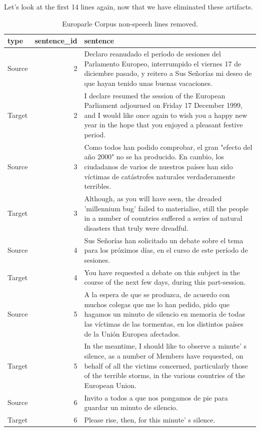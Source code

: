 \documentclass[
  letterpaper,
]{latex/krantz}
\begin{document}
Let's look at the first 14 lines again, now that we have eliminated
these artifacts.

\hypertarget{tbl-td-europarle-preview-2}{}
\begin{table}
\caption{\label{tbl-td-europarle-preview-2}Europarle Corpus non-speech lines removed. }\tabularnewline

\centering
\begin{tabular}{lrl}
\toprule
type & sentence\_id & sentence\\
\midrule
Source & 2 & Declaro reanudado el período de sesiones del Parlamento Europeo, interrumpido el viernes 17 de diciembre pasado, y reitero a Sus Señorías mi deseo de que hayan tenido unas buenas vacaciones.\\
Target & 2 & I declare resumed the session of the European Parliament adjourned on Friday 17 December 1999, and I would like once again to wish you a happy new year in the hope that you enjoyed a pleasant festive period.\\
Source & 3 & Como todos han podido comprobar, el gran "efecto del año 2000" no se ha producido. En cambio, los ciudadanos de varios de nuestros países han sido víctimas de catástrofes naturales verdaderamente terribles.\\
Target & 3 & Although, as you will have seen, the dreaded 'millennium bug' failed to materialise, still the people in a number of countries suffered a series of natural disasters that truly were dreadful.\\
Source & 4 & Sus Señorías han solicitado un debate sobre el tema para los próximos días, en el curso de este período de sesiones.\\
\addlinespace
Target & 4 & You have requested a debate on this subject in the course of the next few days, during this part-session.\\
Source & 5 & A la espera de que se produzca, de acuerdo con muchos colegas que me lo han pedido, pido que hagamos un minuto de silencio en memoria de todas las víctimas de las tormentas, en los distintos países de la Unión Europea afectados.\\
Target & 5 & In the meantime, I should like to observe a minute' s silence, as a number of Members have requested, on behalf of all the victims concerned, particularly those of the terrible storms, in the various countries of the European Union.\\
Source & 6 & Invito a todos a que nos pongamos de pie para guardar un minuto de silencio.\\
Target & 6 & Please rise, then, for this minute' s silence.\\

\end{tabular}
\end{table}
\end{document}
